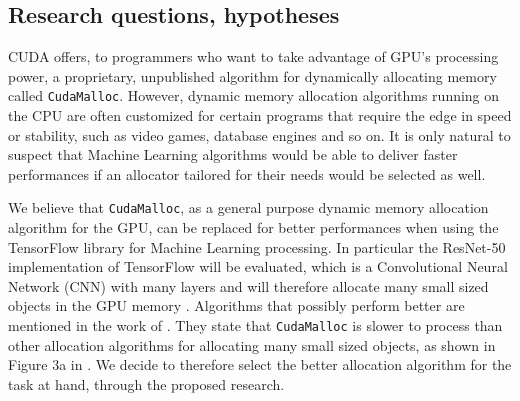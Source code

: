 \documentclass[12pt,twoside]{article}
\begin{document}

\subsection{Research questions, hypotheses}
\label{sect:questions}

\label{sec:problem-statement}



CUDA offers, to programmers who want to take advantage of GPU's processing power, a proprietary, unpublished algorithm for dynamically allocating memory called \texttt{CudaMalloc}. However, dynamic memory allocation algorithms running on the CPU are often customized for certain programs that require the edge in speed or stability, such as video games, database engines and so on. It is only natural to suspect that Machine Learning algorithms would be able to deliver faster performances if an allocator tailored for their needs would be selected as well.

We believe that \texttt{CudaMalloc}, as a general purpose dynamic memory allocation algorithm for the GPU, can be replaced for better performances when using the TensorFlow \cite{abadi2016} library for Machine Learning processing. In particular the ResNet-50 implementation of TensorFlow will be evaluated, which is a Convolutional Neural Network (CNN) with many layers and will therefore allocate many small sized objects in the GPU memory \cite{DBLP:HeZRS15}.
Algorithms that possibly perform better are mentioned in the work of \citeauthor{Vinkler2015} \cite{Vinkler2015}. They state that \texttt{CudaMalloc} is slower to process than other allocation algorithms for allocating many small sized objects, as shown in Figure 3a in \cite{Vinkler2015}. We decide to therefore select the better allocation algorithm for the task at hand, through the proposed research.
\end{document}
